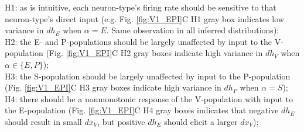 \documentclass[11pt]{article}
\begin{document}
{\addtolength{\leftskip}{10 mm}
H1: as is intuitive, each neuron-type's firing rate should be sensitive to that neuron-type's direct input (e.g. Fig. \ref{fig:V1_EPI}C H1 gray box indicates low variance in $dh_E$ when $\alpha=E$. Same observation in all inferred distributions); \\
H2: the E- and P-populations should be largely unaffected by input to the V-population (Fig. \ref{fig:V1_EPI}C H2 gray boxes indicate high variance in $dh_V$ when $\alpha \in \{E, P \}$); \\
H3: the S-population should be largely unaffected by input to the P-population  (Fig. \ref{fig:V1_EPI}C H3 gray boxes indicate high variance in $dh_P$ when $\alpha =S$); \\
H4: there should be a nonmonotonic response of the V-population with input to the E-population (Fig. \ref{fig:V1_EPI}C H4 gray boxes indicates that negative $dh_E$ should result in small $dx_{V}$, but positive $dh_E$ should elicit a larger $dx_{V}$);

}
\end{document}
